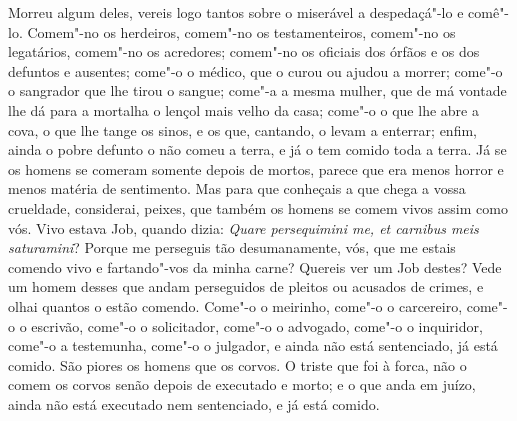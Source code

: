 Morreu algum deles, vereis logo tantos sobre o miserável a
despedaçá"-lo e comê"-lo. Comem"-no os herdeiros, comem"-no os
testamenteiros, comem"-no os legatários, comem"-no os acredores; comem"-no
os oficiais dos órfãos e os dos defuntos e ausentes; come"-o o médico,
que o curou ou ajudou a morrer; come"-o o sangrador que lhe tirou o
sangue; come"-a a mesma mulher, que de má vontade lhe dá para a mortalha
o lençol mais velho da casa; come"-o o que lhe abre a cova, o que lhe
tange os sinos, e os que, cantando, o levam a enterrar; enfim, ainda o
pobre defunto o não comeu a terra, e já o tem comido toda a terra.
Já se os homens se comeram somente depois de mortos, parece que era
menos horror e menos matéria de sentimento. Mas para que conheçais a que
chega a vossa crueldade, considerai, peixes, que também os homens se
comem vivos assim como vós. Vivo estava Job, quando dizia: \emph{Quare
persequimini me, et carnibus meis saturamini}? Porque me perseguis tão
desumanamente, vós, que me estais comendo vivo e fartando"-vos da minha
carne? Quereis ver um Job destes?
Vede um homem desses que andam perseguidos de pleitos ou acusados de
crimes, e olhai quantos o estão comendo. Come"-o o meirinho, come"-o o
carcereiro, come"-o o escrivão, come"-o o solicitador, come"-o o advogado,
come"-o o inquiridor, come"-o a testemunha, come"-o o julgador, e ainda não
está sentenciado, já está comido. São piores os homens que os corvos. O
triste que foi à forca, não o comem os corvos senão depois de executado
e morto; e o que anda em juízo, ainda não está executado nem
sentenciado, e já está comido.

